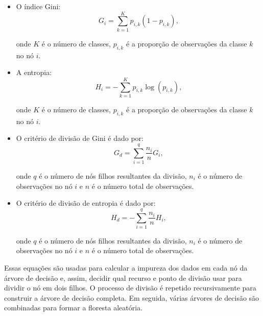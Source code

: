 \begin{itemize}
    \item O índice Gini:
          \begin{equation}
              G_i = \sum_{k=1}^{K} p_{i,k} (1-p_{i,k}),
          \end{equation}

          onde $K$ é o número de classes, $p_{i,k}$ é a proporção de observações da classe $k$ no nó $i$.
    \item A entropia:
          \begin{equation}
              H_i = -\sum_{k=1}^{K} p_{i,k} \log(p_{i,k}),
          \end{equation}

          onde $K$ é o número de classes, $p_{i,k}$ é a proporção de observações da classe $k$ no nó $i$.

    \item O critério de divisão de Gini é dado por:
          \begin{equation}
              G_{d} = \sum_{i=1}^{q}\frac{n_i}{n}G_i,
          \end{equation}

          onde $q$ é o número de nós filhos resultantes da divisão, $n_i$ é o número de observações no nó $i$ e $n$ é o número total de observações.

    \item O critério de divisão de entropia é dado por:
          \begin{equation}
              H_{d} = -\sum_{i=1}^{q}\frac{n_i}{n}H_i,
          \end{equation}

          onde $q$ é o número de nós filhos resultantes da divisão, $n_i$ é o número de observações no nó $i$ e $n$ é o número total de observações.

\end{itemize}

Essas equações são usadas para calcular a impureza dos dados em cada nó da árvore de decisão e, assim, decidir qual recurso e ponto de divisão usar para dividir o nó em dois filhos. O processo de divisão é repetido recursivamente para construir a árvore de decisão completa. Em seguida, várias árvores de decisão são combinadas para formar a floresta aleatória.










